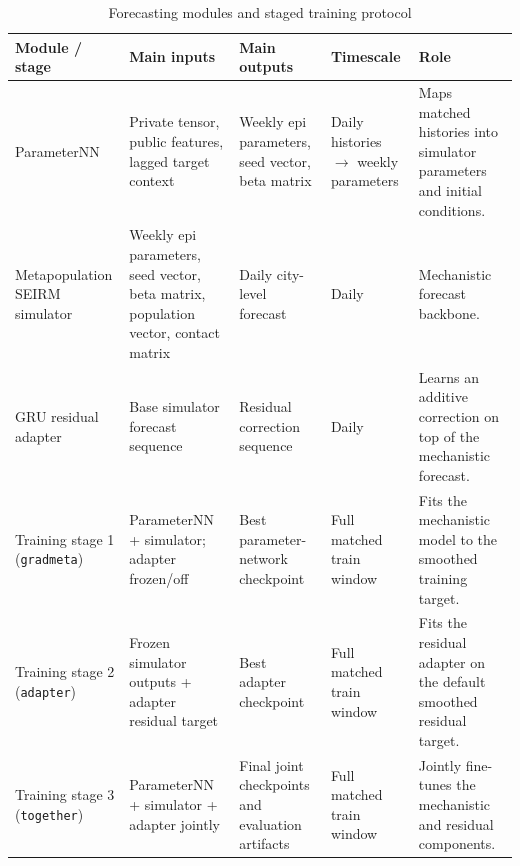 \begin{table}[!htbp]
\centering
\footnotesize
\begin{threeparttable}
\caption{Forecasting modules and staged training protocol}
\label{tab:module_training}
\begin{tabularx}{\textwidth}{>{\raggedright\arraybackslash}p{}>{\raggedright\arraybackslash}p{}>{\raggedright\arraybackslash}p{}>{\raggedright\arraybackslash}p{}>{\raggedright\arraybackslash}X}
\toprule
Module / stage & Main inputs & Main outputs & Timescale & Role \\
\midrule
ParameterNN & Private tensor, public features, lagged target context & Weekly epi parameters, seed vector, beta matrix & Daily histories \(\rightarrow\) weekly parameters & Maps matched histories into simulator parameters and initial conditions. \\
Metapopulation SEIRM simulator & Weekly epi parameters, seed vector, beta matrix, population vector, contact matrix & Daily city-level forecast & Daily & Mechanistic forecast backbone. \\
GRU residual adapter & Base simulator forecast sequence & Residual correction sequence & Daily & Learns an additive correction on top of the mechanistic forecast. \\
Training stage 1 (\texttt{gradmeta}) & ParameterNN + simulator; adapter frozen/off & Best parameter-network checkpoint & Full matched train window & Fits the mechanistic model to the smoothed training target. \\
Training stage 2 (\texttt{adapter}) & Frozen simulator outputs + adapter residual target & Best adapter checkpoint & Full matched train window & Fits the residual adapter on the default smoothed residual target. \\
Training stage 3 (\texttt{together}) & ParameterNN + simulator + adapter jointly & Final joint checkpoints and evaluation artifacts & Full matched train window & Jointly fine-tunes the mechanistic and residual components. \\
\bottomrule
\end{tabularx}
\end{threeparttable}
\end{table}
